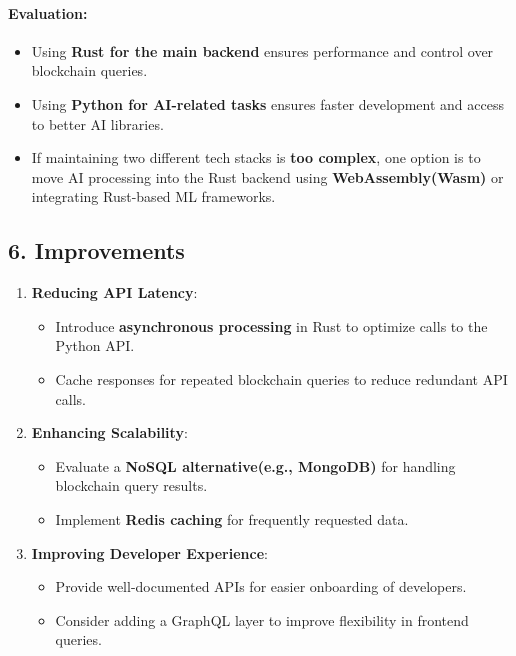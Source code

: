 \documentclass[
]{article}
\providecommand{\tightlist}{%
  \setlength{\itemsep}{0pt}\setlength{\parskip}{0pt}}
\begin{document}
\hypertarget{evaluation-2}{%
\paragraph{\texorpdfstring{\textbf{Evaluation:}}{Evaluation:}}\label{evaluation-2}}

\begin{itemize}
\tightlist
\item
  Using \textbf{Rust for the main backend} ensures performance and
  control over blockchain queries.
\item
  Using \textbf{Python for AI-related tasks} ensures faster development
  and access to better AI libraries.
\item
  If maintaining two different tech stacks is \textbf{too complex}, one
  option is to move AI processing into the Rust backend using
  \textbf{WebAssembly(Wasm)} or integrating Rust-based ML frameworks.
\end{itemize}

\hypertarget{improvements}{%
\subsection{\texorpdfstring{\textbf{6.
Improvements}}{6. Improvements}}\label{improvements}}

\begin{enumerate}
\def\labelenumi{\arabic{enumi}.}
\tightlist
\item
  \textbf{Reducing API Latency}:

  \begin{itemize}
  \tightlist
  \item
    Introduce \textbf{asynchronous processing} in Rust to optimize calls
    to the Python API.
  \item
    Cache responses for repeated blockchain queries to reduce redundant
    API calls.
  \end{itemize}
\item
  \textbf{Enhancing Scalability}:

  \begin{itemize}
  \tightlist
  \item
    Evaluate a \textbf{NoSQL alternative(e.g., MongoDB)} for handling
    blockchain query results.
  \item
    Implement \textbf{Redis caching} for frequently requested data.
  \end{itemize}
\item
  \textbf{Improving Developer Experience}:

  \begin{itemize}
  \tightlist
  \item
    Provide well-documented APIs for easier onboarding of developers.
  \item
    Consider adding a GraphQL layer to improve flexibility in frontend
    queries.
  \end{itemize}
\end{enumerate}
\end{document}
